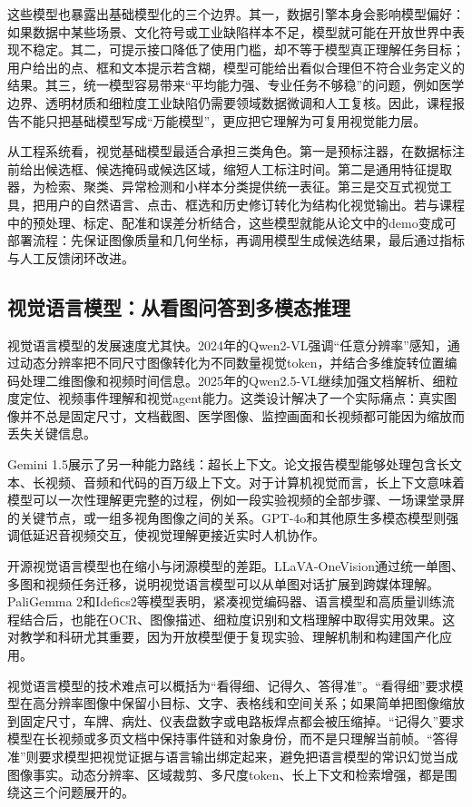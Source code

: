 \documentclass[UTF8,a4paper,12pt]{ctexart}
\newcommand{\model}[1]{\textsf{#1}}
\begin{document}
这些模型也暴露出基础模型化的三个边界。其一，数据引擎本身会影响模型偏好：如果数据中某些场景、文化符号或工业缺陷样本不足，模型就可能在开放世界中表现不稳定。其二，可提示接口降低了使用门槛，却不等于模型真正理解任务目标；用户给出的点、框和文本提示若含糊，模型可能给出看似合理但不符合业务定义的结果。其三，统一模型容易带来“平均能力强、专业任务不够稳”的问题，例如医学边界、透明材质和细粒度工业缺陷仍需要领域数据微调和人工复核。因此，课程报告不能只把基础模型写成“万能模型”，更应把它理解为可复用视觉能力层。

从工程系统看，视觉基础模型最适合承担三类角色。第一是预标注器，在数据标注前给出候选框、候选掩码或候选区域，缩短人工标注时间。第二是通用特征提取器，为检索、聚类、异常检测和小样本分类提供统一表征。第三是交互式视觉工具，把用户的自然语言、点击、框选和历史修订转化为结构化视觉输出。若与课程中的预处理、标定、配准和误差分析结合，这些模型就能从论文中的demo变成可部署流程：先保证图像质量和几何坐标，再调用模型生成候选结果，最后通过指标与人工反馈闭环改进。

\subsection{视觉语言模型：从看图问答到多模态推理}
视觉语言模型的发展速度尤其快。2024年的\model{Qwen2-VL}强调“任意分辨率”感知，通过动态分辨率把不同尺寸图像转化为不同数量视觉token，并结合多维旋转位置编码处理二维图像和视频时间信息\cite{qwen2vl}。2025年的\model{Qwen2.5-VL}继续加强文档解析、细粒度定位、视频事件理解和视觉agent能力\cite{qwen25vl}。这类设计解决了一个实际痛点：真实图像并不总是固定尺寸，文档截图、医学图像、监控画面和长视频都可能因为缩放而丢失关键信息。

\model{Gemini 1.5}展示了另一种能力路线：超长上下文。论文报告模型能够处理包含长文本、长视频、音频和代码的百万级上下文\cite{gemini15}。对于计算机视觉而言，长上下文意味着模型可以一次性理解更完整的过程，例如一段实验视频的全部步骤、一场课堂录屏的关键节点，或一组多视角图像之间的关系。\model{GPT-4o}和其他原生多模态模型则强调低延迟音视频交互，使视觉理解更接近实时人机协作\cite{gpt4o}。

开源视觉语言模型也在缩小与闭源模型的差距。\model{LLaVA-OneVision}通过统一单图、多图和视频任务迁移，说明视觉语言模型可以从单图对话扩展到跨媒体理解\cite{llavaov}。\model{PaliGemma 2}和\model{Idefics2}等模型表明，紧凑视觉编码器、语言模型和高质量训练流程结合后，也能在OCR、图像描述、细粒度识别和文档理解中取得实用效果\cite{paligemma2,idefics2}。这对教学和科研尤其重要，因为开放模型便于复现实验、理解机制和构建国产化应用。

视觉语言模型的技术难点可以概括为“看得细、记得久、答得准”。“看得细”要求模型在高分辨率图像中保留小目标、文字、表格线和空间关系；如果简单把图像缩放到固定尺寸，车牌、病灶、仪表盘数字或电路板焊点都会被压缩掉。“记得久”要求模型在长视频或多页文档中保持事件链和对象身份，而不是只理解当前帧。“答得准”则要求模型把视觉证据与语言输出绑定起来，避免把语言模型的常识幻觉当成图像事实。动态分辨率、区域裁剪、多尺度token、长上下文和检索增强，都是围绕这三个问题展开的。
\end{document}
